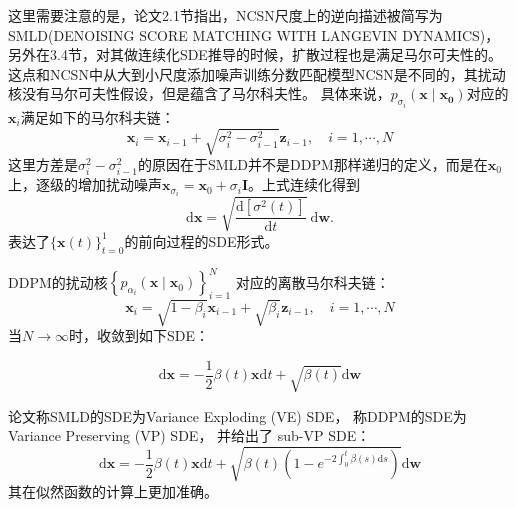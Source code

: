 \documentclass[lang=cn,newtx,10pt,scheme=chinese]{elegantbook}
\begin{document}
这里需要注意的是，论文2.1节指出，NCSN尺度上的逆向描述被简写为SMLD(DENOISING SCORE MATCHING WITH LANGEVIN  DYNAMICS)，另外在3.4节，对其做连续化SDE推导的时候，扩散过程也是满足马尔可夫性的。这点和NCSN中从大到小尺度添加噪声训练分数匹配模型NCSN是不同的，其扰动核没有马尔可夫性假设，但是蕴含了马尔科夫性。
具体来说，$p_{\sigma_i}(\mathbf{x} \mid \mathbf{x_0})$对应的$\mathbf{x}_i$满足如下的马尔科夫链：
\begin{equation}
\mathbf{x}_i=\mathbf{x}_{i-1}+\sqrt{\sigma_i^2-\sigma_{i-1}^2} \mathbf{z}_{i-1}, \quad i=1, \cdots, N
\end{equation}
这里方差是$\sigma_i^2-\sigma_{i-1}^2$的原因在于SMLD并不是DDPM那样递归的定义，而是在$\mathbf{x}_0$上，逐级的增加扰动噪声$\mathbf{x}_{\sigma_i}=\mathbf{x}_0+\sigma_i \mathbf{I}$。上式连续化得到
\begin{equation}
\mathrm{d} \mathbf{x}=\sqrt{\frac{\mathrm{d}\left[\sigma^2(t)\right]}{\mathrm{d} t}} \mathrm{~d} \mathbf{w} .
\end{equation}
表达了$\{\mathbf{x}(t)\}^{1}_{t=0}$的前向过程的SDE形式。

DDPM的扰动核$\left\{p_{\alpha_i}\left(\mathbf{x} \mid \mathbf{x}_0\right)\right\}_{i=1}^N$
对应的离散马尔科夫链：
\begin{equation}
\mathbf{x}_i=\sqrt{1-\beta_i} \mathbf{x}_{i-1}+\sqrt{\beta_i} \mathbf{z}_{i-1}, \quad i=1, \cdots, N
\end{equation}
当$N \rightarrow \infty$时，收敛到如下SDE：

\begin{equation}
\mathrm{d} \mathbf{x}=-\frac{1}{2} \beta(t) \mathbf{x} \mathrm{d} t+\sqrt{\beta(t)} \mathrm{d} \mathbf{w}
\end{equation}

论文称SMLD的SDE为Variance Exploding (VE) SDE， 称DDPM的SDE为Variance Preserving (VP) SDE， 并给出了 sub-VP SDE：
\begin{equation}
\mathrm{d} \mathbf{x}=-\frac{1}{2} \beta(t) \mathbf{x} \mathrm{d} t+\sqrt{\beta(t)\left(1-e^{-2 \int_0^t \beta(s) \mathrm{d} s}\right)} \mathrm{d} \mathbf{w}
\end{equation}其在似然函数的计算上更加准确。
\end{document}
